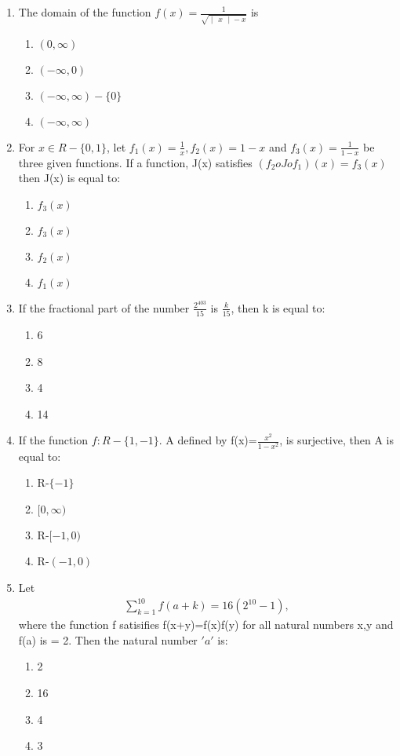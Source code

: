 \begin{enumerate}[label=\arabic*.,ref=\thesubsection.\theenumi]
\item The domain of the function $f(x)=\frac{1}{\sqrt{\begin{vmatrix} x \end{vmatrix} - x}}$ is
\begin{enumerate}
\item $(0,\infty)$
\item $(-\infty,0)$
\item $(-\infty,\infty)-\{0\}$
\item $(-\infty,\infty)$
\end{enumerate}

\item For $x \in R-\{0,1\}$, let $f_{1}(x)=\frac{1}{x}, f_{2}(x)=1-x$ and $f_{3}(x)=\frac{1}{1-x}$ be three given functions. If a function, J(x) satisfies $(f_{2}oJof_{1})(x)=f_{3}(x)$ then J(x) is equal to:
\begin{enumerate}
\item $f_3(x)$
\item $f_3(x)$
\item $f_2(x)$
\item $f_1(x)$
\end{enumerate} 

\item If the fractional part of the number $\frac{2^{403}}{15}$ is $\frac{k}{15}$, then k is equal to:
\begin{enumerate}
\item 6
\item 8
\item 4
\item 14
\end{enumerate}

\item If the function $f:R-\{1,-1\}$. A defined by f(x)=$\frac{x^2}{1-x^2}$, is surjective, then A is equal to:
\begin{enumerate}
\item R-$\{-1\}$
\item $[0,\infty)$
\item R-$[-1,0)$
\item R-$(-1,0)$
\end{enumerate}

\item Let
\begin{align*}
\sum_{k=1}^{10} f(a+k)=16(2^{10}-1),
\end{align*} 
where the function f satisifies f(x+y)=f(x)f(y) for all natural numbers x,y and f(a) is = 2. Then the natural number $'a'$ is:
\begin{enumerate}
\item 2
\item 16
\item 4
\item 3
\end{enumerate}


\end{enumerate}
